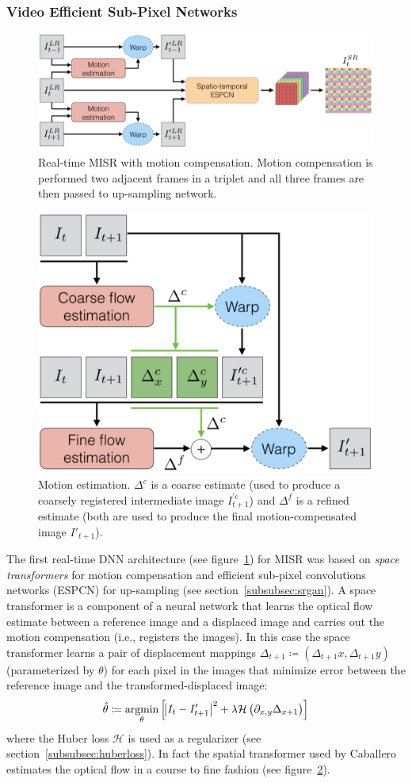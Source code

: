 \subsubsection{Video Efficient Sub-Pixel Networks}
\begin{figure}
    \includegraphics[width=.49\textwidth]{figures/neural_networks/realtime_epscn.png}
    \caption{Real-time MISR with motion compensation\cite{caballero2017real}. Motion compensation is performed two adjacent frames in a triplet and all three frames are then passed to up-sampling network.}\label{fig:realtimeepscn}
\end{figure}
\begin{figure}
    \includegraphics[width=.49\textwidth]{figures/neural_networks/space_transformer.png}
    \caption{Motion estimation\cite{caballero2017real}. \(\Delta^c\) is a coarse estimate (used to produce a coarsely registered intermediate image \(I_{t+1}^{'c}\)) and \(\Delta^f\) is a refined estimate (both are used to produce the final motion-compensated image \(I'_{t+1}\)).}\label{fig:spacetransformer}
\end{figure}
The first real-time DNN architecture (see figure~\ref{fig:realtimeepscn}) for MISR was based on \textit{space transformers} for motion compensation and efficient sub-pixel convolutions networks (ESPCN) for up-sampling (see section~\ref{subsubsec:srgan}).
%
A space transformer \cite{jaderberg2015spatial} is a component of a neural network that learns the optical flow estimate between a reference image and a displaced image and carries out the motion compensation (i.e., registers the images).
%
In this case the space transformer learns a pair of displacement mappings \(\Delta_{t+1} \coloneqq (\Delta_{t+1}x, \Delta_{t+1} y)\) (parameterized by \(\theta\)) for each pixel in the images that minimize error between the reference image and the transformed-displaced image:
\begin{equation}
    \hat{\theta} \coloneqq \underset{\theta}{\text{argmin}}\left[\abs{I_t - I'_{t+1}}^2 + \lambda \mathcal{H}\left( \partial_{x,y} \Delta_{x+1} \right)\right]
\end{equation}
where the Huber loss \(\mathcal{H}\) is used as a regularizer (see section~\ref{subsubsec:huberloss}).
%
In fact the spatial transformer used by Caballero \etal estimates the optical flow in a course to fine fashion (see figure~\ref{fig:spacetransformer}).


